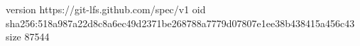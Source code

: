 version https://git-lfs.github.com/spec/v1
oid sha256:518a987a22d8c8a6ec49d2371be268788a7779d07807e1ee38b438415a456c43
size 87544
